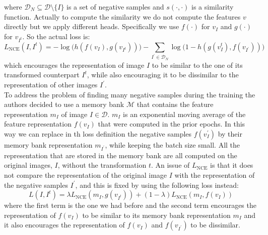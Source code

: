 where $\mathcal{D}_N \subseteq \mathcal{D} \setminus \{I\}$ is a set of negative samples and $s(\cdot, \cdot)$ is a similarity function. Actually to compute the similarity we do not compute the features $v$ directly but we apply different heads. Specifically we use $f(\cdot)$ for $v_I$ and $g(\cdot)$ for $v_{I^t}$. So the actual loss is:
\[L_{\text{NCE}}(I, I^t) = -\log\big(h(f(v_I), g(v_{I^t}))\big) - \sum_{I^\prime \in \mathcal{D}_N} \log\big(1 - h(g(v^t_I), f(v_{I^\prime}))\big) \]
which encourages the representation of image $I$ to be similar to the one of its transformed counterpart $I^t$, while also encouraging it to be dissimilar to the representation of other images $I^\prime$.\\
To address the problem of finding many negative samples during the training the authors decided to use a memory bank $\mathcal{M}$ that contains the feature representation $m_I$ of image $I \in \mathcal{D}$. $m_I$ is an exponential moving average of the feature representation $f(v_I)$ that were computed in the prior epochs. In this way we can replace in th loss definition the negative samples $f(v^\prime_I)$ by their memory bank representation $m_{I^\prime}$, while keeping the batch size small. All the representation that are stored in the memory bank are all computed on the original images, $I$, without the transformation $t$. An issue of $L_{\text{NCE}}$ is that it does not compare the representation of the original image $I$ with the representation of the negative samples $I^\prime$, and this is fixed by using the following loss instead:
\[ L(I,I^t) = \lambda L_{\text{NCE}}(m_I, g(v_{I^t})) + (1-\lambda)L_{\text{NCE}}(m_I, f(v_I)) \]
where the first term is the one we had before and the second term encourages the representation of $f(v_I)$ to be similar to its memory bank representation $m_I$ and it also encourages the representation of $f(v_I)$ and $f(v_{I^\prime})$ to be dissimilar. 
